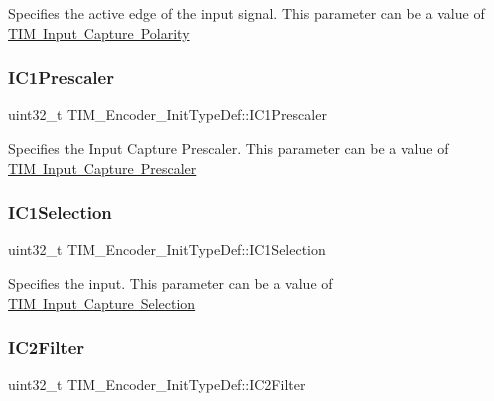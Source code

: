 Specifies the active edge of the input signal. This parameter can be a value of \mbox{\hyperlink{group___t_i_m___input___capture___polarity}{T\+IM Input Capture Polarity}} \mbox{\label{struct_t_i_m___encoder___init_type_def_a56307eb4766e3f0e1cd1cd3c4fc2157e}} 
\subsubsection{\texorpdfstring{IC1Prescaler}{IC1Prescaler}}
{\footnotesize\ttfamily uint32\+\_\+t T\+I\+M\+\_\+\+Encoder\+\_\+\+Init\+Type\+Def\+::\+I\+C1\+Prescaler}

Specifies the Input Capture Prescaler. This parameter can be a value of \mbox{\hyperlink{group___t_i_m___input___capture___prescaler}{T\+IM Input Capture Prescaler}} \mbox{\label{struct_t_i_m___encoder___init_type_def_a85fbdebacff594ff1ad0d16eddfdc179}} 
\subsubsection{\texorpdfstring{IC1Selection}{IC1Selection}}
{\footnotesize\ttfamily uint32\+\_\+t T\+I\+M\+\_\+\+Encoder\+\_\+\+Init\+Type\+Def\+::\+I\+C1\+Selection}

Specifies the input. This parameter can be a value of \mbox{\hyperlink{group___t_i_m___input___capture___selection}{T\+IM Input Capture Selection}} \mbox{\label{struct_t_i_m___encoder___init_type_def_a30cdb580735007aa9735b2f5cc133049}} 
\subsubsection{\texorpdfstring{IC2Filter}{IC2Filter}}
{\footnotesize\ttfamily uint32\+\_\+t T\+I\+M\+\_\+\+Encoder\+\_\+\+Init\+Type\+Def\+::\+I\+C2\+Filter}

